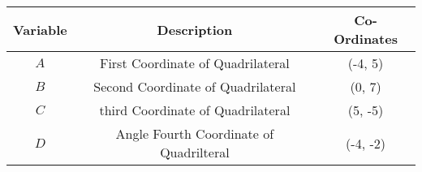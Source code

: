\begin{center}
    \begin{tabular}{|c|c|c|} 
        \hline
            \textbf{Variable} & \textbf{Description} & \textbf{Co-Ordinates} \\ 
        \hline
	    $A$    & First Coordinate of Quadrilateral & (-4, 5) \\ 
        \hline
	    $B$    & Second Coordinate of Quadrilateral  & (0, 7)\\ 
        \hline
	    $C$    & third Coordinate of Quadrilateral  & (5, -5)\\
            \hline
	    $D$& Angle Fourth Coordinate of Quadrilteral  & (-4, -2)\\
        \hline
    \end{tabular}
\end{center}
